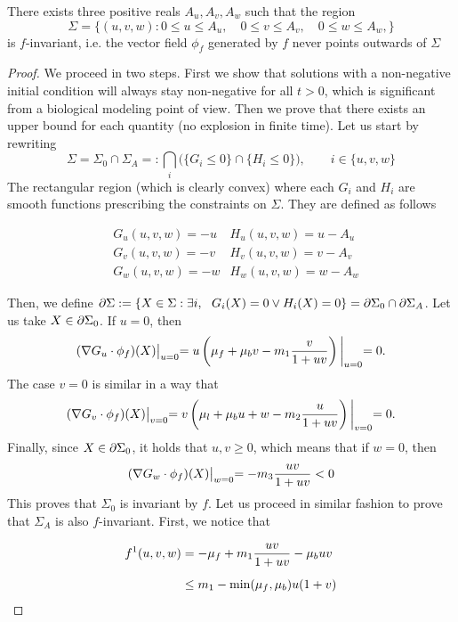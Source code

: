 \begin{lemma}
	There exists three positive reals $A_u, A_v, A_w$ such that the region $$\Sigma = \bigl\{(u, v, w) : 0 \le u \le A_u, \quad 0 \le v \le A_v, \quad  0 \le w \le A_w, \bigr\}$$ is $f$-invariant, i.e. the vector field $\phi_f$ generated by $f$ never points outwards of $\Sigma$
\end{lemma}

\begin{proof}
	We proceed in two steps. First we show that solutions with a non-negative initial condition will always stay non-negative for all $t>0$, which is significant from a  biological modeling point of view. Then we prove that there exists an upper bound for each quantity (no explosion in finite time). Let us start by rewriting $$\Sigma = \Sigma_0 \cap \Sigma_A =: \bigcap_i \biggl( \{G_i \le 0\} \cap \{H_i \le 0\}\biggr), \qquad i \in \{u, v, w\}$$
	The rectangular region (which is clearly convex) where each $G_i$ and $H_i$ are smooth functions prescribing the constraints on $\Sigma$. They are defined as follows
	
	\begin{align*}
		& G_u(u, v, w) = -u & H_u(u, v, w) = u - A_u \\[1em]
		& G_v(u, v, w) = -v & H_v(u, v, w) = v - A_v \\[1em]
		& G_w(u, v, w) = -w & H_w(u, v, w) = w - A_w
	\end{align*}

	Then, we define $\partial\Sigma := \{X \in \Sigma : \exists i, \ \  G_i(X) = 0 \lor H_i(X) = 0 \} = \partial \Sigma_0 \cap \partial \Sigma_A$. Let us take $X \in \partial \Sigma_0$. If $u=0$, then $$(\nabla G_u \cdot \phi_f)(X)\bigl\vert_{u=0} = u \left( \mu_f  + \mu_b v - m_1 \dfrac{v}{1 + uv}\right)\biggl\vert_{u=0} = 0.$$ The case $v= 0$ is similar in a way that
	$$(\nabla G_v \cdot \phi_f)(X)\bigl\vert_{v=0} = v \left( \mu_l  + \mu_b u + w - m_2 \dfrac{u}{1 + uv}\right)\biggl\vert_{v=0} = 0.$$ Finally, since $X \in \partial\Sigma_0$, it holds that $u, v \ge 0$, which means that if $w=0$, then $$(\nabla G_w \cdot \phi_f)(X)\bigl\vert_{w=0} = -m_3 \dfrac{uv}{1 + uv} < 0$$ This proves that $\Sigma_0$ is invariant by $f$. Let us proceed in similar fashion to prove that $\Sigma_A$ is also $f$-invariant. First, we notice that
	
	\begin{align}
		f^1(u, v, w) &= -\mu_f + m_1 \dfrac{uv}{1 + uv} - \mu_b uv \notag \\[0.5em]
		& \le m_1 - \min(\mu_f, \mu_b) u (1 + v) \notag
	\end{align}
	

\end{proof}
